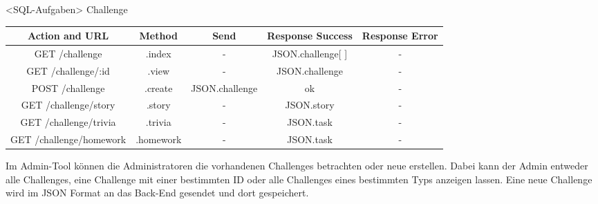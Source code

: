 \newpage
\begin{interface}{40}{<SQL-Aufgaben>}
Challenge
\begin{center}
	\begin{tabular}[h]{|c|c|c|c|c|}
	\hline
	\textbf{Action and URL} &\textbf {Method} &\textbf {Send} &\textbf {Response Success} & \textbf{Response Error}\\
	\hline
	GET     /challenge & .index & - & JSON.challenge[ ] & - \\
	\hline
	GET     /challenge/:id & .view  & - & JSON.challenge & - \\
	\hline
	POST     /challenge & .create & JSON.challenge & ok & - \\
	\hline
	GET     /challenge/story & .story & - & JSON.story  & - \\
	\hline
	GET     /challenge/trivia & .trivia  & - & JSON.task & - \\
	\hline
	GET     /challenge/homework & .homework & - & JSON.task & - \\
	\hline
	 \end{tabular}
\end{center}

Im Admin-Tool können die Administratoren die vorhandenen Challenges betrachten oder neue erstellen.
Dabei kann der Admin entweder alle Challenges, eine Challenge mit einer bestimmten ID oder alle Challenges eines bestimmten Typs anzeigen lassen.
Eine neue Challenge wird im JSON Format an das Back-End gesendet und dort gespeichert.


\end{interface}

